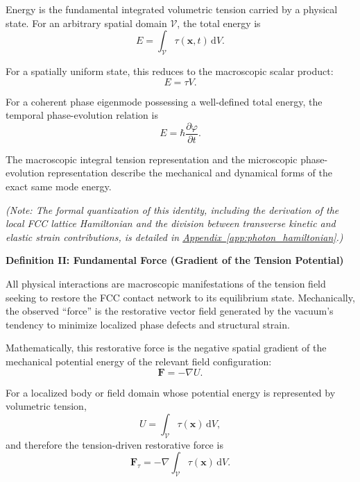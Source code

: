 Energy is the fundamental integrated volumetric tension carried by a physical state. For an arbitrary spatial domain $\mathcal{V}$, the total energy is
\begin{equation}
    E = \int_{\mathcal{V}} \tau(\mathbf{x},t) \,\mathrm{d}V.
\end{equation}

For a spatially uniform state, this reduces to the macroscopic scalar product:
\begin{equation}
    E = \tau V.
\end{equation}

For a coherent phase eigenmode possessing a well-defined total energy, the temporal phase-evolution relation is
\begin{equation}
    E = \hbar \frac{\partial\varphi}{\partial t}.
\end{equation}

The macroscopic integral tension representation and the microscopic phase-evolution representation describe the mechanical and dynamical forms of the exact same mode energy. 

\vspace{0.5em}
\noindent\textit{(Note: The formal quantization of this identity, including the derivation of the local FCC lattice Hamiltonian and the division between transverse kinetic and elastic strain contributions, is detailed in \hyperref[app:photon_hamiltonian]{Appendix~\ref*{app:photon_hamiltonian}}.)}

\vspace{0.5em}
\newpage
{}
\label{def:definition_two}
\noindent\textbf{Definition II: Fundamental Force (Gradient of the Tension Potential)}

All physical interactions are macroscopic manifestations of the tension field seeking to restore the FCC contact network to its equilibrium state. Mechanically, the observed ``force'' is the restorative vector field generated by the vacuum's tendency to minimize localized phase defects and structural strain. 

Mathematically, this restorative force is the negative spatial gradient of the mechanical potential energy of the relevant field configuration:
\begin{equation}
    \mathbf{F} = -\nabla U.
\end{equation}

For a localized body or field domain whose potential energy is represented by volumetric tension,
\begin{equation}
    U = \int_{\mathcal{V}} \tau(\mathbf{x}) \,\mathrm{d}V,
\end{equation}
and therefore the tension-driven restorative force is
\begin{equation}
    \mathbf{F}_{\tau} = -\nabla \int_{\mathcal{V}} \tau(\mathbf{x}) \,\mathrm{d}V.
\end{equation}

